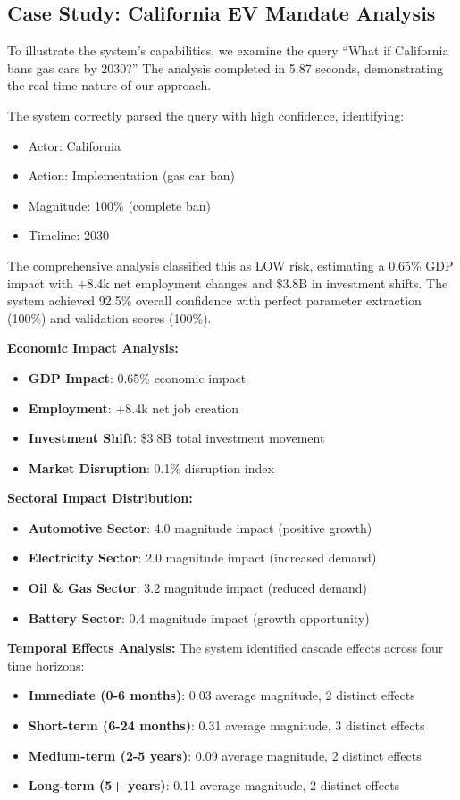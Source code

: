 \documentclass[conference]{IEEEtran}
\begin{document}
\subsection{Case Study: California EV Mandate Analysis}

To illustrate the system's capabilities, we examine the query ``What if California bans gas cars by 2030?'' The analysis completed in 5.87 seconds, demonstrating the real-time nature of our approach.

The system correctly parsed the query with high confidence, identifying:
\begin{itemize}
\item Actor: California
\item Action: Implementation (gas car ban)
\item Magnitude: 100\% (complete ban)
\item Timeline: 2030
\end{itemize}

The comprehensive analysis classified this as LOW risk, estimating a 0.65\% GDP impact with +8.4k net employment changes and \$3.8B in investment shifts. The system achieved 92.5\% overall confidence with perfect parameter extraction (100\%) and validation scores (100\%).

\textbf{Economic Impact Analysis:}
\begin{itemize}
\item \textbf{GDP Impact}: 0.65\% economic impact
\item \textbf{Employment}: +8.4k net job creation
\item \textbf{Investment Shift}: \$3.8B total investment movement
\item \textbf{Market Disruption}: 0.1\% disruption index
\end{itemize}

\textbf{Sectoral Impact Distribution:}
\begin{itemize}
\item \textbf{Automotive Sector}: 4.0 magnitude impact (positive growth)
\item \textbf{Electricity Sector}: 2.0 magnitude impact (increased demand)
\item \textbf{Oil \& Gas Sector}: 3.2 magnitude impact (reduced demand)
\item \textbf{Battery Sector}: 0.4 magnitude impact (growth opportunity)
\end{itemize}

\textbf{Temporal Effects Analysis:}
The system identified cascade effects across four time horizons:
\begin{itemize}
\item \textbf{Immediate (0-6 months)}: 0.03 average magnitude, 2 distinct effects
\item \textbf{Short-term (6-24 months)}: 0.31 average magnitude, 3 distinct effects
\item \textbf{Medium-term (2-5 years)}: 0.09 average magnitude, 2 distinct effects
\item \textbf{Long-term (5+ years)}: 0.11 average magnitude, 2 distinct effects
\end{itemize}
\end{document}

